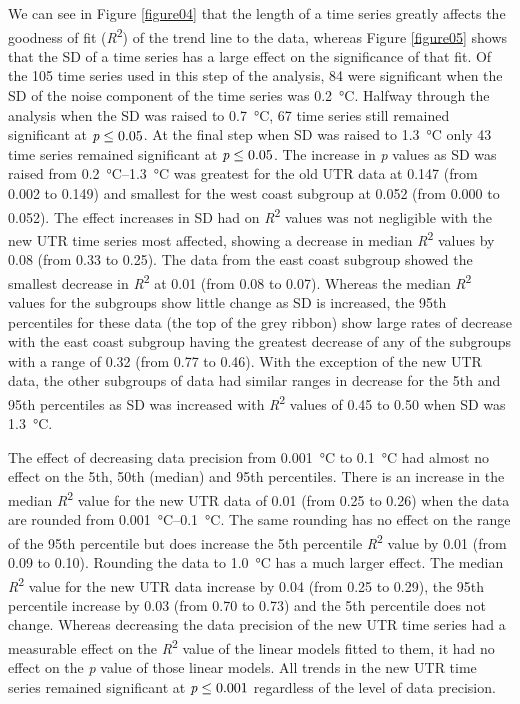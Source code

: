 \documentclass{ametsoc}
\begin{document}
We can see in Figure \ref{figure04} that the length of a time series greatly affects the goodness of fit (\emph{R}\textsuperscript{2}) of the trend line to the data, whereas Figure \ref{figure05} shows that the SD of a time series has a large effect on the significance of that fit. Of the 105 time series used in this step of the analysis, 84 were significant when the SD of the noise component of the time series was \SI{0.2}{\degreeCelsius}. Halfway through the analysis when the SD was raised to \SI{0.7}{\degreeCelsius}, 67 time series still remained significant at $\emph{p} \leq 0.05$. At the final step when SD was raised to \SI{1.3}{\degreeCelsius} only 43 time series remained significant at $\emph{p} \leq 0.05$. The increase in \emph{p} values as SD was raised from \SIrange{0.2}{1.3}{\degreeCelsius} was greatest for the old UTR data at 0.147 (from 0.002 to 0.149) and smallest for the west coast subgroup at 0.052 (from 0.000 to 0.052). The effect increases in SD had on \emph{R}\textsuperscript{2} values was not negligible with the new UTR time series most affected, showing a decrease in median \emph{R}\textsuperscript{2} values by 0.08 (from 0.33 to 0.25). The data from the east coast subgroup showed the smallest decrease in \emph{R}\textsuperscript{2} at 0.01 (from 0.08 to 0.07). Whereas the median \emph{R}\textsuperscript{2} values for the subgroups show little change as SD is increased, the 95th percentiles for these data (the top of the grey ribbon) show large rates of decrease with the east coast subgroup having the greatest decrease of any of the subgroups with a range of 0.32 (from 0.77 to 0.46). With the exception of the new UTR data, the other subgroups of data had similar ranges in decrease for the 5th and 95th percentiles as SD was increased with \emph{R}\textsuperscript{2} values of 0.45 to 0.50 when SD was \SI{1.3}{\degreeCelsius}.

The effect of decreasing data precision from \SI{0.001}{\degreeCelsius} to \SI{0.1}{\degreeCelsius} had almost no effect on the 5th, 50th (median) and 95th percentiles. There is an increase in the median \emph{R}\textsuperscript{2} value for the new UTR data of 0.01 (from 0.25 to 0.26) when the data are rounded from \SIrange{0.001}{0.1}{\degreeCelsius}. The same rounding has no effect on the range of the 95th percentile but does increase the 5th percentile \emph{R}\textsuperscript{2} value by 0.01 (from 0.09 to 0.10). Rounding the data to \SI{1.0}{\degreeCelsius} has a much larger effect. The median \emph{R}\textsuperscript{2} value for the new UTR data increase by 0.04 (from 0.25 to 0.29), the 95th percentile increase by 0.03 (from 0.70 to 0.73) and the 5th percentile does not change. Whereas decreasing the data precision of the new UTR time series had a measurable effect on the \emph{R}\textsuperscript{2} value of the linear models fitted to them, it had no effect on the \emph{p} value of those linear models. All trends in the new UTR time series remained significant at $\emph{p} \leq 0.001$ regardless of the level of data precision.
\end{document}
